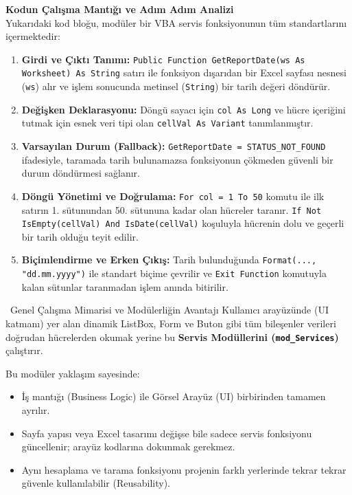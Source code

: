 \vspace{0.2cm}
\noindent \textbf{Kodun Çalışma Mantığı ve Adım Adım Analizi}\\

Yukarıdaki kod bloğu, modüler bir VBA servis fonksiyonunun tüm standartlarını içermektedir:

\begin{enumerate}
    \item \textbf{Girdi ve Çıktı Tanımı:} \texttt{Public Function GetReportDate(ws As Worksheet) As String} satırı ile fonksiyon dışarıdan bir Excel sayfası nesnesi (\texttt{ws}) alır ve işlem sonucunda metinsel (\texttt{String}) bir tarih değeri döndürür.
    \item \textbf{Değişken Deklarasyonu:} Döngü sayacı için \texttt{col As Long} ve hücre içeriğini tutmak için esnek veri tipi olan \texttt{cellVal As Variant} tanımlanmıştır.
    \item \textbf{Varsayılan Durum (Fallback):} \texttt{GetReportDate = STATUS\_NOT\_FOUND} ifadesiyle, taramada tarih bulunamazsa fonksiyonun çökmeden güvenli bir durum döndürmesi sağlanır.
    \item \textbf{Döngü Yönetimi ve Doğrulama:} \texttt{For col = 1 To 50} komutu ile ilk satırın 1. sütunundan 50. sütununa kadar olan hücreler taranır. \texttt{If Not IsEmpty(cellVal) And IsDate(cellVal)} koşuluyla hücrenin dolu ve geçerli bir tarih olduğu teyit edilir.
    \item \textbf{Biçimlendirme ve Erken Çıkış:} Tarih bulunduğunda \texttt{Format(..., "dd.mm.yyyy")} ile standart biçime çevrilir ve \texttt{Exit Function} komutuyla kalan sütunlar taranmadan işlem anında bitirilir.
\end{enumerate}

\vspace{0.2cm}

\begin{infobox}{\faSitemap\ Genel Çalışma Mimarisi ve Modülerliğin Avantajı}
Kullanıcı arayüzünde (UI katmanı) yer alan dinamik ListBox, Form ve Buton gibi tüm bileşenler verileri doğrudan hücrelerden okumak yerine bu \textbf{Servis Modüllerini (\texttt{mod\_Services})} çalıştırır. 

Bu modüler yaklaşım sayesinde:
\begin{itemize}
    \item İş mantığı (Business Logic) ile Görsel Arayüz (UI) birbirinden tamamen ayrılır.
    \item Sayfa yapısı veya Excel tasarımı değişse bile sadece servis fonksiyonu güncellenir; arayüz kodlarına dokunmak gerekmez.
    \item Aynı hesaplama ve tarama fonksiyonu projenin farklı yerlerinde tekrar tekrar güvenle kullanılabilir (Reusability).
\end{itemize}
\end{infobox}